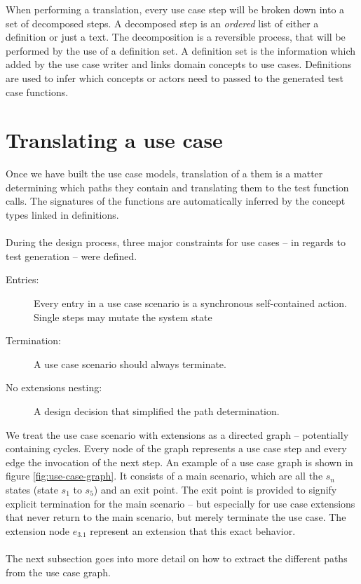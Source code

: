 When performing a translation, every use case step will be broken down into a set of decomposed steps. A decomposed step is an \emph{ordered} list of either a definition or just a text. The decomposition is a reversible process, that will be performed by the use of a definition set. A definition set is the information which added by the use case writer and links domain concepts to use cases. Definitions are used to infer which concepts or actors need to passed to the generated test case functions.

\section{Translating a use case}
Once we have built the use case models, translation of a them is a matter determining which paths they contain and translating them to the test function calls. The signatures of the functions are automatically inferred by the concept types linked in definitions.\\\\
During the design process, three major constraints for use cases -- in regards to test generation -- were defined. 
\begin{description}
  \item[Entries:] Every entry in a use case scenario is a synchronous self-contained action. Single steps may mutate the system state
  \item[Termination:] A use case scenario should always terminate.
  \item[No extensions nesting:] A design decision that simplified the path determination.
\end{description}
We treat the use case scenario with extensions as a directed graph -- potentially containing cycles. Every node of the graph represents a use case step and every edge the invocation of the next step. An example of a use case graph is shown in figure \ref{fig:use-case-graph}. It consists of a main scenario, which are all the $s_n$ states (state $s_1$ to $s_5$) and an exit point. The exit point is provided to signify explicit termination for the main scenario -- but especially for use case extensions that never return to the main scenario, but merely terminate the use case. The extension node $e_{3.1}$ represent an extension that this exact behavior.\\\\
The next subsection goes into more detail on how to extract the different paths from the use case graph.


